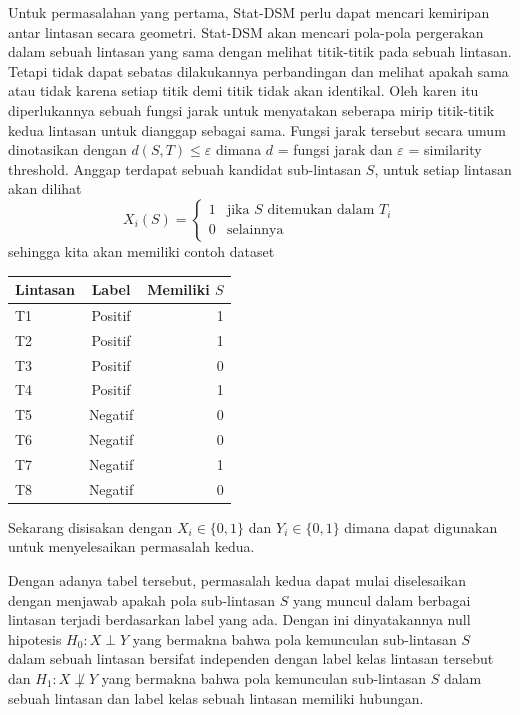 \documentclass[a4paper,twoside]{article}
\begin{document}
Untuk permasalahan yang pertama, Stat-DSM perlu dapat mencari kemiripan antar lintasan secara geometri.
Stat-DSM akan mencari pola-pola pergerakan dalam sebuah lintasan yang sama dengan melihat titik-titik pada sebuah lintasan.
Tetapi tidak dapat sebatas dilakukannya perbandingan dan melihat apakah sama atau tidak karena setiap titik demi titik tidak akan identikal.
Oleh karen itu diperlukannya sebuah fungsi jarak untuk menyatakan seberapa mirip titik-titik kedua lintasan untuk dianggap sebagai sama.
Fungsi jarak tersebut secara umum dinotasikan dengan $d(S,T) \leq \varepsilon$ dimana $d$ = fungsi jarak dan $\varepsilon$ = similarity threshold.
Anggap terdapat sebuah kandidat sub-lintasan $S$, untuk setiap lintasan akan dilihat
\begin{equation}
	X_i(S) = \begin{cases} 
		1 & \text{jika } S \text{ ditemukan dalam } T_i \\ 
		0 & \text{selainnya} 
	\end{cases}
\end{equation}
sehingga kita akan memiliki contoh dataset 
\begin{table}[h]
	\centering
	\begin{tabular}{l|c|r}
		\toprule
		\textbf{Lintasan} & \textbf{Label} & \textbf{Memiliki $S$} \\
		\midrule
		T1 & Positif & 1 \\
		T2 & Positif & 1 \\
		T3 & Positif & 0 \\
		T4 & Positif & 1 \\
		T5 & Negatif & 0 \\
		T6 & Negatif & 0 \\
		T7 & Negatif & 1 \\
		T8 & Negatif & 0 \\
		\bottomrule
	\end{tabular}
\end{table}

Sekarang disisakan dengan $X_i\in\{0,1\}$ dan $Y_i\in\{0,1\}$ dimana dapat digunakan untuk menyelesaikan permasalah kedua.

Dengan adanya tabel tersebut, permasalah kedua dapat mulai diselesaikan dengan menjawab apakah pola sub-lintasan $S$ yang muncul dalam berbagai lintasan terjadi berdasarkan label yang ada.
Dengan ini dinyatakannya null hipotesis $H_0: X \perp Y$ yang bermakna bahwa pola kemunculan sub-lintasan $S$ dalam sebuah lintasan bersifat independen dengan label kelas lintasan tersebut
dan $H_1: X \not\perp Y$ yang bermakna bahwa pola kemunculan sub-lintasan $S$ dalam sebuah lintasan dan label kelas sebuah lintasan memiliki hubungan.
\end{document}
